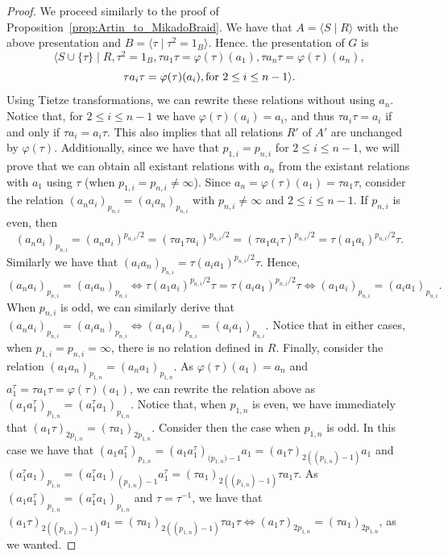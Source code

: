 \documentclass[11pt,letterpaper]{amsart}
\begin{document}
\begin{proof}
We proceed similarly to the proof of Proposition~\ref{prop:Artin_to_MikadoBraid}. We have that $A=\langle S\mid R\rangle$ with the above presentation and $B=\langle \tau\mid \tau^2=1_B\rangle$. Hence. the presentation of $G$ is
$$\langle S\cup \{\tau\} \mid R, \tau^2=1_B, \tau a_1\tau = \varphi(\tau)(a_1), \tau a_n\tau = \varphi(\tau)(a_n),$$
$$ \tau a_i \tau = \varphi(\tau)(a_i),\textnormal{for }2\leq i\leq n-1\rangle.$$
Using Tietze transformations, we can rewrite these relations without using $a_n$.
Notice that, for $2\leq i\leq  n-1$ we have $\varphi(\tau)(a_i)=a_i$, and thus $\tau a_i\tau=a_i$ if and only if $\tau a_i=a_i\tau$. This also implies that all relations $R'$ of $A'$ are unchanged by $\varphi(\tau)$. Additionally, since we have that $p_{1,i}=p_{n,i}$ for $2 \leq i \leq n-1$, we will prove that we can obtain all existant relations with $a_n$ from the existant relations with $a_1$ using $\tau$ (when $p_{1,i}=p_{n,i}\neq \infty$).
Since $a_n = \varphi(\tau)(a_1)=\tau a_1\tau$, consider the relation $(a_na_i)_{p_{n,i}}=(a_ia_n)_{p_{n,i}}$ with $p_{n,i}\neq\infty$ and $2\leq i\leq  n-1$. If $p_{n,i}$ is even, then  $$(a_na_i)_{p_{n,i}}= (a_na_i)^{p_{n,i}/2} = (\tau a_1 \tau a_i)^{p_{n,i}/2}= (\tau a_1  a_i\tau)^{p_{n,i}/2}=\tau( a_1  a_i)^{p_{n,i}/2}\tau.$$ Similarly we have that $(a_ia_n)_{p_{n,i}} = \tau (a_ia_1)^{p_{n,i}/2}\tau$. Hence, $$(a_na_i)_{p_{n,i}}=(a_ia_n)_{p_{n,i}}\Leftrightarrow \tau( a_1  a_i)^{p_{n,i}/2}\tau = \tau (a_ia_1)^{p_{n,i}/2}\tau\Leftrightarrow ( a_1  a_i)_{p_{n,i}} = (a_ia_1)_{p_{n,i}}.$$
When $p_{n,i}$ is odd, we can similarly derive that $(a_na_i)_{p_{n,i}}=(a_ia_n)_{p_{n,i}} \Leftrightarrow (a_1a_i)_{p_{n,i}}=(a_ia_1)_{p_{n,i}}$.
Notice that in either cases, when $p_{1,i}=p_{n,i}=\infty$, there is no relation defined in $R$. Finally, consider the relation $(a_1a_n)_{p_{1,n}}=(a_na_1)_{p_{1,n}}$. As $\varphi(\tau)(a_1)=a_n$ and $a_1^\tau=\tau a_1 \tau = \varphi(\tau)(a_1)$, we can rewrite the relation above as $(a_1 a_1^\tau )_{p_{1,n}}= (a_1^\tau a_1)_{p_{1,n}}$. Notice that, when $p_{1,n}$ is even, we have immediately that $(a_1\tau)_{2{p_{1,n}}}=(\tau a_1)_{2{p_{1,n}}}$. Consider then the case when $p_{1,n}$ is odd.
In this case we have that $(a_1 a_1^\tau)_{p_{1,n}} = (a_1 a_1^\tau)_{{(p_{1,n}})-1} a_1 = (a_1\tau)_{2(({p_{1,n}})-1)}a_1$ and $ (a_1^\tau a_1)_{p_{1,n}} = (a_1^\tau a_1)_{{(p_{1,n})}-1} a_1^\tau = (\tau a_1)_{2({(p_{1,n})}-1)} \tau a_1 \tau $. As $(a_1 a_1^\tau )_{p_{1,n}}= (a_1^\tau a_1)_{p_{1,n}}$ and $\tau=\tau^{-1}$, we have that $(a_1\tau)_{2({(p_{1,n})}-1)}a_1 = (\tau a_1)_{2({(p_{1,n})}-1)} \tau a_1 \tau \Leftrightarrow (a_1\tau)_{2{p_{1,n}}}=(\tau a_1)_{2{p_{1,n}}}$, as we wanted.

\end{proof}
\end{document}

